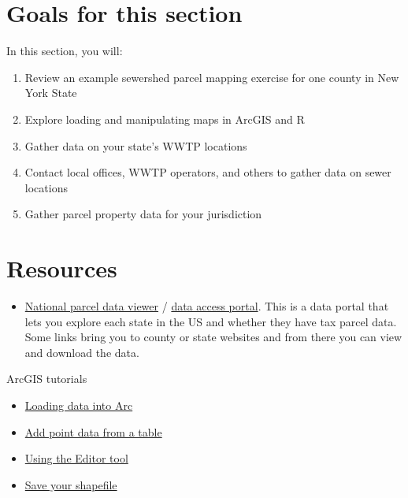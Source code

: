 \documentclass[
]{book}
\providecommand{\tightlist}{%
  \setlength{\itemsep}{0pt}\setlength{\parskip}{0pt}}
\begin{document}
\hypertarget{goals-for-this-section-1}{%
\section{Goals for this section}\label{goals-for-this-section-1}}

In this section, you will:

\begin{enumerate}
\def\labelenumi{\arabic{enumi}.}
\tightlist
\item
  Review an example sewershed parcel mapping exercise for one county in New York State
\item
  Explore loading and manipulating maps in ArcGIS and R
\item
  Gather data on your state's WWTP locations
\item
  Contact local offices, WWTP operators, and others to gather data on sewer locations
\item
  Gather parcel property data for your jurisdiction
\end{enumerate}

\hypertarget{resources-1}{%
\section{Resources}\label{resources-1}}

\begin{itemize}
\tightlist
\item
  \href{https://www.arcgis.com/apps/mapviewer/index.html?url=https://services5.arcgis.com/fmKivMCp6fwbWbeE/ArcGIS/rest/services/2023_NSGIC_Parcel_Portal/FeatureServer\&source=sd}{National parcel data viewer} / \href{https://services5.arcgis.com/fmKivMCp6fwbWbeE/ArcGIS/rest/services/2023_NSGIC_Parcel_Portal/FeatureServer}{data access portal}. This is a data portal that lets you explore each state in the US and whether they have tax parcel data. Some links bring you to county or state websites and from there you can view and download the data.
\end{itemize}

ArcGIS tutorials

\begin{itemize}
\item
  \href{https://pro.arcgis.com/en/pro-app/latest/help/data/geodatabases/overview/load-data.htm}{Loading data into Arc}
\item
  \href{https://pro.arcgis.com/en/pro-app/latest/get-started/create-points-from-a-table.htm}{Add point data from a table}
\item
  \href{https://desktop.arcgis.com/en/arcmap/latest/manage-data/editing-fundamentals/adding-the-editor-toolbar.htm}{Using the Editor tool}
\item
  \href{https://pro.arcgis.com/en/pro-app/latest/help/data/geodatabases/overview/export-data.htm}{Save your shapefile}
\end{itemize}
\end{document}
